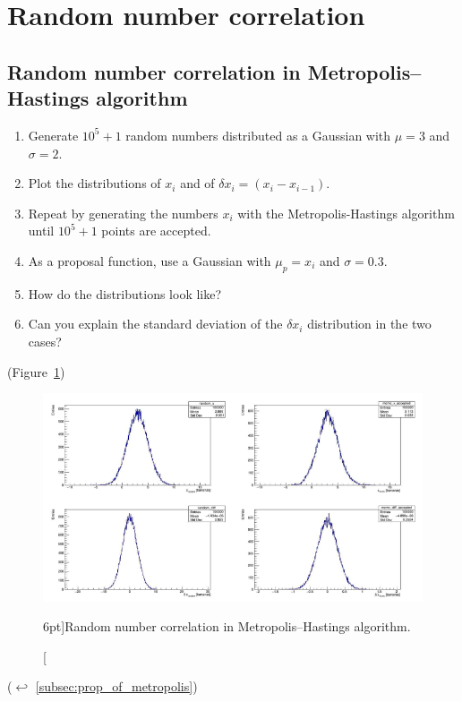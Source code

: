 

\newpage

\section{Random number correlation}
\label{exer:random_number_corr}

\subsection{Random number correlation in Metropolis–Hastings algorithm}

\begin{enumerate}
	\item Generate $10^{5} + 1$ random numbers distributed as a Gaussian with $\mu = 3$ and $\sigma = 2$.
	\item Plot the distributions of $x_{i}$ and of $\delta x_{i} = (x_{i} - x_{i - 1})$.
	\item Repeat by generating the numbers $x_{i}$ with the Metropolis-Hastings algorithm until $10^{5} + 1$ points are accepted.
	\item As a proposal function, use a Gaussian with $\mu_{p} = x_{i}$ and $\sigma = 0.3$.
	\item How do the distributions look like?
	\item Can you explain the standard deviation of the $\delta x_{i}$ distribution in the two cases?
\end{enumerate}

(Figure~\ref{fig:random_number_corr})

\begin{figure}
	\includegraphics{exercise/random_number_corr.png}
	\caption[Random number correlation in Metropolis–Hastings algorithm.][6pt]{Random number correlation in Metropolis–Hastings algorithm.}
	\label{fig:random_number_corr}
\end{figure}

($\hookleftarrow$ \ref{subsec:prop_of_metropolis})
